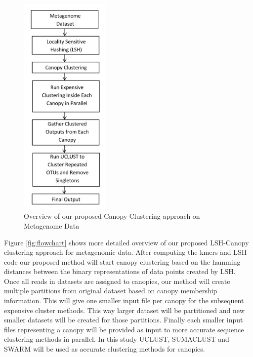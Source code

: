 \documentclass[10pt, conference, compsocconf]{IEEEtran}
\begin{document}
\begin{figure}
	\centering
	\includegraphics[width=0.5\linewidth,height=11cm]{overall.jpg}	
	\caption{Overview of our proposed Canopy Clustering approach on Metagenome Data}
	\label{fig:overall}
\end{figure} 

Figure \ref{fig:flowchart} shows more detailed overview of our proposed LSH-Canopy clustering approach for metagenomic data. After computing the kmers and LSH code our proposed method will start canopy clustering based on the hamming distances between the binary representations of data points created by LSH. Once all reads in datasets are assigned to canopies, our method will create multiple partitions from original dataset based on canopy membership information. This will give one smaller input file per canopy for the subsequent expensive cluster methods. This way larger dataset will be partitioned and new smaller datasets will be created for those partitions. Finally each smaller input files representing a canopy will be provided as input to more accurate sequence clustering methods in parallel. In this study UCLUST, SUMACLUST and SWARM will be used as accurate clustering methods for canopies.
\end{document}
